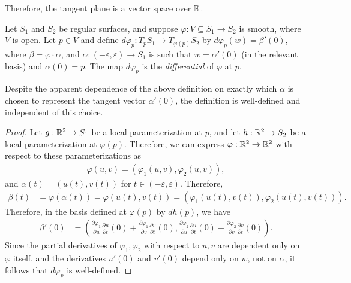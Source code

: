 \begin{cor}
    Therefore, the tangent plane is a vector space over $\mathbb{R}$.
\end{cor}

\begin{defn}
    Let $S_1$ and $S_2$ be regular surfaces, and suppose $\varphi: V \subseteq S_1 \to S_2$ is smooth, where $V$ is open. Let $p \in V$ and define $d\varphi_p: T_pS_1 \to T_{\varphi(p)}S_2$ by $d\varphi_p(w) = \beta'(0)$, where $\beta = \varphi \cdot \alpha$, and $\alpha: (-\varepsilon, \varepsilon) \to S_1$ is such that $w = \alpha'(0)$ (in the relevant basis) and $\alpha(0) = p$. The map $d\varphi_p$ is the \emph{differential} of $\varphi$ at $p$.
\end{defn}

\begin{prop}
    Despite the apparent dependence of the above definition on exactly which $\alpha$ is chosen to represent the tangent vector $\alpha'(0)$, the definition is well-defined and independent of this choice.
\end{prop}

\begin{proof}
    Let $g: \mathbb{R}^2 \to S_1$ be a local parameterization at $p$, and let $h: \mathbb{R}^2 \to S_2$ be a local parameterization at $\varphi(p)$. Therefore, we can express $\varphi: \mathbb{R}^2 \to \mathbb{R}^2$ with respect to these parameterizations as
    \begin{align*}
        \varphi(u, v) = (\varphi_1(u, v), \varphi_2(u, v)),
    \end{align*}
    and $\alpha(t) = (u(t), v(t))$ for $t \in (-\varepsilon, \varepsilon)$. Therefore,
    \begin{align*}
        \beta(t) &= \varphi(\alpha(t)) = \varphi(u(t), v(t)) = \left(\varphi_1(u(t), v(t)), \varphi_2(u(t), v(t))\right).
    \end{align*}
    Therefore, in the basis defined at $\varphi(p)$ by $dh(p)$, we have
    \begin{align*}
        \beta'(0) &= \left(\frac{\partial \varphi_1}{\partial u}\frac{\partial u}{\partial t}(0) + \frac{\partial \varphi_1}{\partial v}\frac{\partial v}{\partial t}(0), \frac{\partial \varphi_2}{\partial u}\frac{\partial u}{\partial t}(0) + \frac{\partial \varphi_2}{\partial v}\frac{\partial v}{\partial t}(0)\right).
    \end{align*}
    Since the partial derivatives of $\varphi_1, \varphi_2$ with respect to $u, v$ are dependent only on $\varphi$ itself, and the derivatives $u'(0)$ and $v'(0)$ depend only on $w$, not on $\alpha$, it follows that $d\varphi_p$ is well-defined.
\end{proof}

